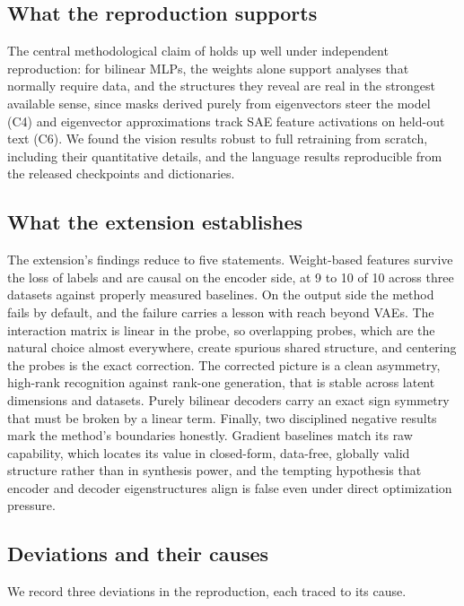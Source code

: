 \documentclass[10pt]{article} %
\begin{document}
\subsection{What the reproduction supports}

The central methodological claim of \citet{pearce2025bilinear} holds up well under
independent reproduction: for bilinear MLPs, the weights alone support analyses that
normally require data, and the structures they reveal are real in the strongest
available sense, since masks derived purely from eigenvectors steer the model (C4)
and eigenvector approximations track SAE feature activations on held-out text (C6).
We found the vision results robust to full retraining from scratch, including their
quantitative details, and the language results reproducible from the released
checkpoints and dictionaries.

\subsection{What the extension establishes}

The extension's findings reduce to five statements. Weight-based features survive
the loss of labels and are causal on the encoder side, at 9 to 10 of 10 across
three datasets against properly measured baselines. On the output side the method
fails by default, and the failure carries a lesson with reach beyond VAEs. The
interaction matrix is linear in the probe, so overlapping probes, which are the
natural choice almost everywhere, create spurious shared structure, and centering
the probes is the exact correction. The corrected picture is a clean asymmetry,
high-rank recognition against rank-one generation, that is stable across latent
dimensions and datasets. Purely bilinear decoders carry an exact sign symmetry
that must be broken by a linear term. Finally, two disciplined negative results
mark the method's boundaries honestly. Gradient baselines match its raw
capability, which locates its value in closed-form, data-free, globally valid
structure rather than in synthesis power, and the tempting hypothesis that encoder
and decoder eigenstructures align is false even under direct optimization
pressure.

\subsection{Deviations and their causes}
\label{sec:deviations}

We record three deviations in the reproduction, each traced to its cause.
\end{document}
